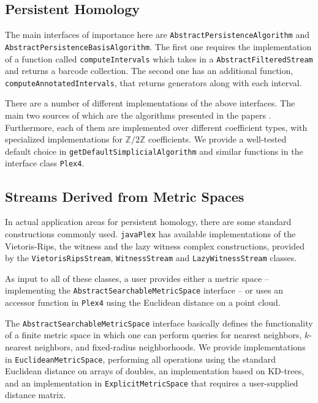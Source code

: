 \documentclass[11pt]{amsart}
\newcommand\javaPlex{\texttt{javaPlex}\xspace}
\begin{document}
\subsection{Persistent Homology}

The main interfaces of importance here are  \texttt{Abstract\-Persistence\-Algorithm} and  \texttt{Abstract\-Persistence\-Basis\-Algorithm}. The first one requires the implementation of a function called  \texttt{computeIntervals} which takes in a  \texttt{AbstractFilteredStream} and returns a barcode collection. The second one has an additional function,  \texttt{computeAnnotatedIntervals}, that returns generators along with each interval.

There are a number of different implementations of the above interfaces. The main two sources of which are the algorithms presented in the papers \cite{Carlsson_04, Dualities}. Furthermore, each of them are implemented over different coefficient types, with specialized implementations for $\mathbb{Z}/2\mathbb{Z}$ coefficients. We provide a well-tested default choice in \texttt{getDefaultSimplicialAlgorithm} and similar functions in the interface class \texttt{Plex4}.

\subsection{Streams Derived from Metric Spaces}

In actual application areas for persistent homology, there are some standard constructions commonly used. \javaPlex has available implementations of the Vietoris-Rips, the witness and the lazy witness complex constructions, provided by the  \texttt{VietorisRipsStream},  \texttt{WitnessStream} and  \texttt{LazyWitnessStream} classes. 

As input to all of these classes, a user provides either a metric space -- implementing the \texttt{AbstractSearchableMetricSpace} interface -- or uses an accessor function in \texttt{Plex4} using the Euclidean distance on a point cloud.

The  \texttt{AbstractSearchableMetricSpace} interface basically defines the functionality of a finite metric space in which one can perform queries for nearest neighbors, $k$-nearest neighbors, and fixed-radius neighborhoods. We provide implementations in \texttt{EuclideanMetricSpace}, performing all operations using the standard Euclidean distance on arrays of doubles, an implementation based on KD-trees, and an implementation in \texttt{ExplicitMetricSpace} that requires a user-supplied distance matrix. 
\end{document}
